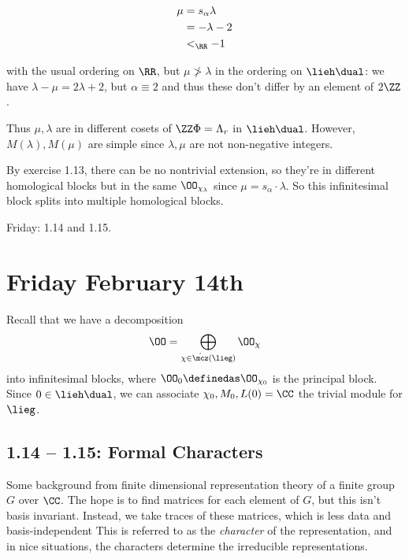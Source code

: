 \begin{description}
\begin{align*}
\mu 
&= s_\alpha \lambda  \\
&= -\lambda - 2  \\
&<_{\RR} -1
\end{align*}

with the usual ordering on \(\RR\), but \(\mu \not > \lambda\) in the
ordering on \(\lieh\dual\): we have \(\lambda - \mu = 2\lambda + 2\),
but \(\alpha \equiv 2\) and thus these don't differ by an element of
\(2\ZZ\).

Thus \(\mu, \lambda\) are in different cosets of \(\ZZ\Phi = \Lambda_r\)
in \(\lieh\dual\). However, \(M(\lambda), M(\mu)\) are simple since
\(\lambda, \mu\) are not non-negative integers.

By exercise 1.13, there can be no nontrivial extension, so they're in
different homological blocks but in the same \(\OO_{\chi_\lambda}\)
since \(\mu = s_\alpha \cdot \lambda\). So this infinitesimal block
splits into multiple homological blocks.
\end{description}

Friday: 1.14 and 1.15.

\hypertarget{friday-february-14th}{%
\section{Friday February 14th}\label{friday-february-14th}}

Recall that we have a decomposition
\begin{align*}\OO = \bigoplus_{\chi \in \hat\mcz(\lieg)} \OO_\chi\end{align*}
into infinitesimal blocks, where \(\OO_0 \definedas \OO_{\chi_0}\) is
the principal block. Since \(0\in\lieh\dual\), we can associate
\(\chi_0, M_0, L(0) = \CC\) the trivial module for \(\lieg\).

\hypertarget{formal-characters}{%
\subsection{1.14 -- 1.15: Formal Characters}\label{formal-characters}}

Some background from finite dimensional representation theory of a
finite group \(G\) over \(\CC\). The hope is to find matrices for each
element of \(G\), but this isn't basis invariant. Instead, we take
traces of these matrices, which is less data and basis-independent This
is referred to as the \emph{character} of the representation, and in
nice situations, the characters determine the irreducible
representations.

